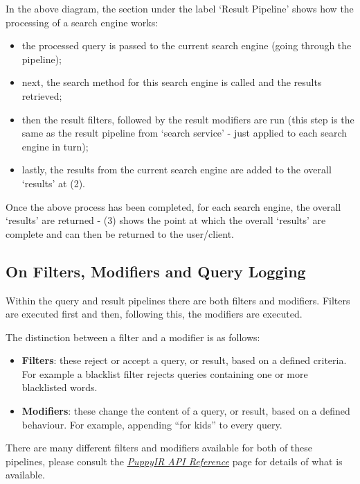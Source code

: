 \documentclass[letterpaper,10pt,english]{sphinxmanual}
\begin{document}
In the above diagram, the section under the label `Result Pipeline' shows how the processing of a search engine works:
\begin{itemize}
\item {} 
the processed query is passed to the current search engine (going through the pipeline);

\item {} 
next, the search method for this search engine is called and the results retrieved;

\item {} 
then the result filters, followed by the result modifiers are run (this step is the same as the result pipeline from `search service' - just applied to each search engine in turn);

\item {} 
lastly, the results from the current search engine are added to the overall `results' at (2).

\end{itemize}

Once the above process has been completed, for each search engine, the overall `results' are returned - (3) shows the point at which the overall `results' are complete and can then be returned to the user/client.


\subsection{On Filters, Modifiers and Query Logging}
\label{pipeline:on-filters-modifiers-and-query-logging}
Within the query and result pipelines there are both filters and modifiers. Filters are executed first and then, following this, the modifiers are executed.

The distinction between a filter and a modifier is as follows:
\begin{itemize}
\item {} 
\textbf{Filters}: these reject or accept a query, or result, based on a defined criteria. For example a blacklist filter rejects queries containing one or more blacklisted words.

\item {} 
\textbf{Modifiers}: these change the content of a query, or result, based on a defined behaviour. For example, appending “for kids” to every query.

\end{itemize}

There are many different filters and modifiers available for both of these pipelines, please consult the {\hyperref[api2.0:api]{\emph{PuppyIR API Reference}}} page for details of what is available.
\end{document}
